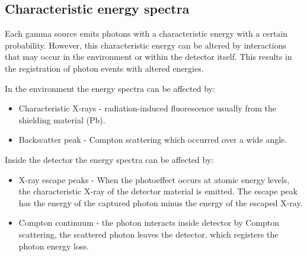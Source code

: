 \subsection{Characteristic energy spectra}
\label{char}
Each gamma source emits photons with a characteristic energy with a certain probability. However, this characteristic energy can be altered by interactions that may occur in the environment or within the detector itself. This results in the registration of photon events with altered energies.
\par
In the environment the energy spectra can be affected by:
\begin{itemize}
\item Characteristic X-rays - radiation-induced fluorescence usually from the shielding material (Pb).
\item Backscatter peak - Compton scattering which occurred over a wide angle.
\end{itemize}
\par
Inside the detector the energy spectra can be affected by:
\begin{itemize}
\item X-ray escape peaks - When the photoeffect occurs at atomic energy levels, the characteristic X-ray of the detector material is emitted. The escape peak has the energy of the captured photon minus the energy of the escaped X-ray.
\item Compton continuum - the photon interacts inside detector by Compton scattering, the scattered photon leaves the detector,  which registers the photon energy loss.
\end{itemize}

